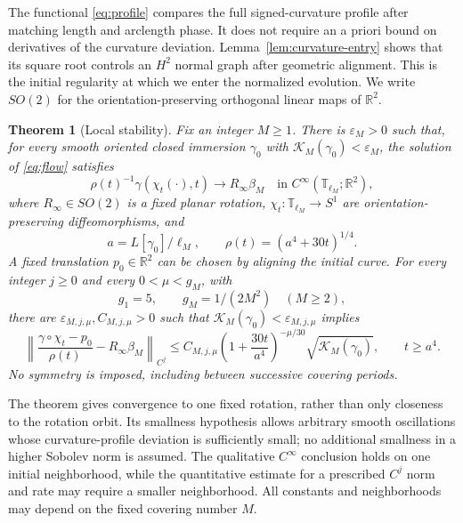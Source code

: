 \documentclass[a4paper,11pt]{article}
\numberwithin{equation}{section}
\newtheorem{theorem}{Theorem}[section]
\theoremstyle{definition}
\theoremstyle{remark}
\newcommand{\R}{\mathbb R}
\newcommand{\T}{\mathbb T}
\newcommand{\KM}{\mathcal K_M}
\begin{document}
The functional \eqref{eq:profile} compares the full signed-curvature profile after matching length and arclength phase. It does not require an a priori bound on derivatives of the curvature deviation. Lemma~\ref{lem:curvature-entry} shows that its square root controls an $H^2$ normal graph after geometric alignment. This is the initial regularity at which we enter the normalized evolution. We write $SO(2)$ for the orientation-preserving orthogonal linear maps of $\R^2$.

\begin{theorem}[Local stability]\label{thm:main}
Fix an integer $M\ge1$. There is $\varepsilon_M>0$ such that, for every smooth oriented closed immersion $\gamma_0$ with $\KM(\gamma_0)<\varepsilon_M$, the solution of \eqref{eq:flow} satisfies
\begin{equation}\label{eq:main-convergence}
 \rho(t)^{-1}\gamma(\chi_t(\cdot),t)\longrightarrow R_\infty\beta_M
 \quad\text{in }C^\infty(\T_{\ell_M};\R^2),
\end{equation}
where $R_\infty\in SO(2)$ is a fixed planar rotation, $\chi_t:\T_{\ell_M}\to S^1$ are orientation-preserving diffeomorphisms, and
\begin{equation}\label{eq:rho-intro}
 a=L[\gamma_0]/\ell_M,\qquad \rho(t)=(a^4+30t)^{1/4}.
\end{equation}
A fixed translation $p_0\in\R^2$ can be chosen by aligning the initial curve. For every integer $j\ge0$ and every $0<\mu<g_M$, with
\begin{equation}\label{eq:certified-gaps}
 g_1=5,\qquad g_M=1/(2M^2)\quad(M\ge2),
\end{equation}
there are $\varepsilon_{M,j,\mu},C_{M,j,\mu}>0$ such that $\KM(\gamma_0)<\varepsilon_{M,j,\mu}$ implies
\begin{equation}\label{eq:main-rate}
 \left\|\frac{\gamma\circ\chi_t-p_0}{\rho(t)}-R_\infty\beta_M\right\|_{C^j}
 \le C_{M,j,\mu}\left(1+\frac{30t}{a^4}\right)^{-\mu/30}
       \sqrt{\KM(\gamma_0)},\qquad t\ge a^4.
\end{equation}
No symmetry is imposed, including between successive covering periods.
\end{theorem}

The theorem gives convergence to one fixed rotation, rather than only closeness to the rotation orbit. Its smallness hypothesis allows arbitrary smooth oscillations whose curvature-profile deviation is sufficiently small; no additional smallness in a higher Sobolev norm is assumed. The qualitative $C^\infty$ conclusion holds on one initial neighborhood, while the quantitative estimate for a prescribed $C^j$ norm and rate may require a smaller neighborhood. All constants and neighborhoods may depend on the fixed covering number $M$.
\end{document}
